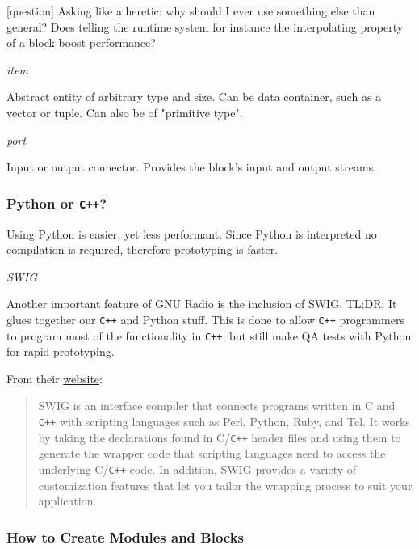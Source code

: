 \documentclass{article}
\begin{document}
\color{blue}
[question] Asking like a heretic: why should I ever use something else than general? Does telling the runtime system for instance the interpolating property of a block boost performance?
\color{black}

\medskip

\emph{item}

Abstract entity of arbitrary type and size. Can be data container, such as a vector or tuple. Can also be of "primitive type".

\bigskip

\emph{port}

Input or output connector. Provides the block's input and output streams. 

\bigskip

\subsubsection{Python or \texttt{C++}?}

Using Python is easier, yet less performant. Since Python is interpreted no compilation is required, therefore prototyping is faster.

\bigskip

\emph{SWIG}

Another important feature of GNU Radio is the inclusion of SWIG. TL;DR: It glues together our \texttt{C++} and Python stuff. This is done to allow \texttt{C++} programmers to program most of the functionality in \texttt{C++}, but still make QA tests with Python for rapid prototyping.  

\bigskip

From their \href{http://swig.org/exec.html}{website}:

\begin{quote}
SWIG is an interface compiler that connects programs written in C and \texttt{C++} with scripting languages such as Perl, Python, Ruby, and Tcl. It works by taking the declarations found in C/\texttt{C++} header files and using them to generate the wrapper code that scripting languages need to access the underlying C/\texttt{C++} code. In addition, SWIG provides a variety of customization features that let you tailor the wrapping process to suit your application.
\end{quote}

\subsubsection{How to Create Modules and Blocks}
\end{document}
